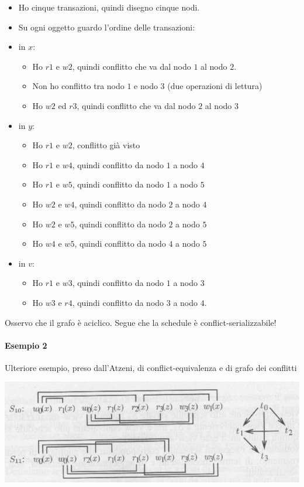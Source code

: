 \begin{itemize}
	\item Ho cinque transazioni, quindi disegno cinque nodi.
	\item Su ogni oggetto guardo l'ordine delle transazioni:
	\item in $x$:
	\begin{itemize}
		\item Ho $r1$ e $w2$, quindi conflitto che va dal nodo $1$ al nodo $2$. 
		\item Non ho conflitto tra nodo $1$ e nodo $3$ (due operazioni di lettura)
		\item Ho $w2$ ed $r3$, quindi conflitto che va dal nodo $2$ al nodo $3$
	\end{itemize}
	\item in $y$:
	\begin{itemize}
		\item Ho $r1$ e $w2$, conflitto già visto
		\item Ho $r1$ e $w4$, quindi conflitto da nodo $1$ a nodo $4$ 
		\item Ho $r1$ e $w5$, quindi conflitto da nodo $1$ a nodo $5$
		\item Ho $w2$ e $w4$, quindi conflitto da nodo $2$ a nodo $4$
		\item Ho $w2$ e $w5$, quindi conflitto da nodo $2$ a nodo $5$
		\item Ho $w4$ e $w5$, quindi conflitto da nodo $4$ a nodo $5$
	\end{itemize}
	\item in $v$:
	\begin{itemize}
		\item Ho $r1$ e $w3$, quindi conflitto da nodo $1$ a nodo $3$
		\item Ho $w3$ e $r4$, quindi conflitto da nodo $3$ a nodo $4$.
	\end{itemize}
\end{itemize}
Osservo che il grafo è aciclico. Segue che la schedule è conflict-serializzabile!
\paragraph{Esempio 2} Ulteriore esempio, preso dall'Atzeni, di conflict-equivalenza e di grafo dei conflitti
\begin{center}\includegraphics{images/228.PNG}\end{center}
